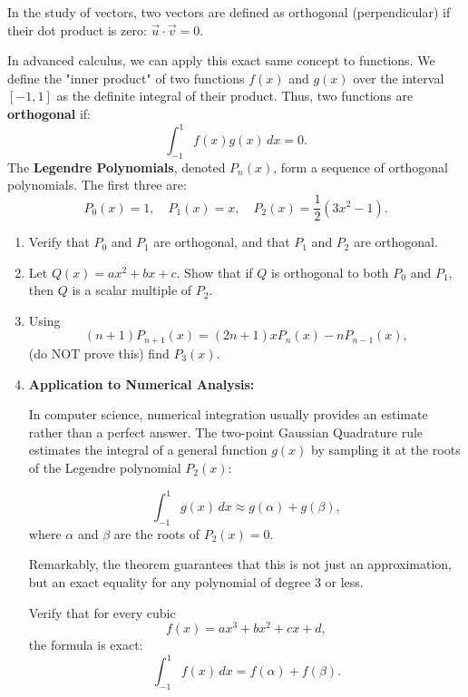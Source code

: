 \begin{problem}





In the study of vectors, two vectors are defined as orthogonal (perpendicular) if their dot product is zero: $\vec{u} \cdot \vec{v} = 0$.

In advanced calculus, we can apply this exact same concept to functions. We define the "inner product" of two functions $f(x)$ and $g(x)$ over the interval $[-1, 1]$ as the definite integral of their product. Thus, two functions are \textbf{orthogonal} if:
\[
\int_{-1}^{1} f(x)g(x) \, dx = 0.
\]
The \textbf{Legendre Polynomials}, denoted $P_n(x)$, form a sequence of orthogonal polynomials. The first three are:
\[
P_0(x) = 1,\quad P_1(x) = x,\quad P_2(x) = \frac{1}{2}(3x^2 - 1).
\]

\begin{enumerate}[label=(\roman*)]
\item Verify that $P_0$ and $P_1$ are orthogonal, and that $P_1$ and $P_2$ are orthogonal.
\item Let $Q(x)=ax^2+bx+c$. Show that if $Q$ is orthogonal to both $P_0$ and $P_1$, then $Q$ is a scalar multiple of $P_2$.
\item Using
\[
(n+1)P_{n+1}(x)=(2n+1)xP_n(x)-nP_{n-1}(x),
\]
(do NOT prove this) find $P_3(x)$.
\item \textbf{Application to Numerical Analysis:} 

 In computer science, numerical integration usually provides an estimate rather than a perfect answer. The two-point Gaussian Quadrature rule estimates the integral of a general function $g(x)$ by sampling it at the roots of the Legendre polynomial $P_2(x)$:

\[
\int_{-1}^{1} g(x)\,dx \approx g(\alpha)+g(\beta),
\]
where $\alpha$ and $\beta$ are the roots of $P_2(x)=0$.

Remarkably, the theorem guarantees that this is not just an approximation, but an exact equality for any polynomial of degree 3 or less.

Verify that for every cubic
\[
f(x)=ax^3+bx^2+cx+d,
\]
the formula is exact:
\[
\int_{-1}^{1} f(x)\,dx=f(\alpha)+f(\beta).
\]
\end{enumerate}
\end{problem}

